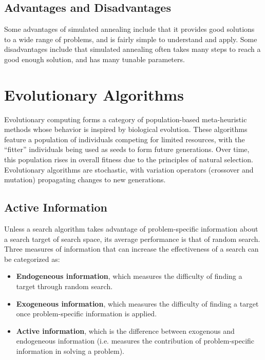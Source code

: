 \documentclass[12pt,titlepage]{article}
\begin{document}
    \subsection{Advantages and Disadvantages}
      Some advantages of simulated annealing include that it provides good solutions to a wide range of problems, and is fairly simple to understand and apply.
      Some disadvantages include that simulated annealing often takes many steps to reach a good enough solution, and has many tunable parameters.

  \newpage

  \section{Evolutionary Algorithms}
    Evolutionary computing forms a category of population-based meta-heuristic methods whose behavior is inspired by biological evolution. These algorithms feature a population of
    individuals competing for limited resources, with the ``fitter'' individuals being used as seeds to form future generations. Over time, this population rises in overall fitness
    due to the principles of natural selection. Evolutionary algorithms are stochastic, with variation operators (crossover and mutation) propagating changes to new generations.

    \subsection{Active Information}
      Unless a search algorithm takes advantage of problem-specific information about a search target of search space, its average performance is that of random search. Three measures of
      information that can increase the effectiveness of a search can be categorized as:
      \begin{itemize}
        \item \textbf{Endogeneous information}, which measures the difficulty of finding a target through random search.
        \item \textbf{Exogeneous information}, which measures the difficulty of finding a target once problem-specific information is applied.
        \item \textbf{Active information}, which is the difference between exogenous and endogeneous information (i.e. measures the contribution of problem-specific information in solving
          a problem).
      \end{itemize}
\end{document}
